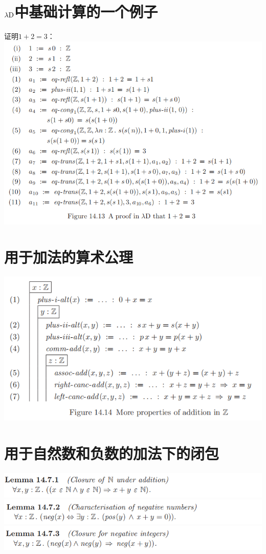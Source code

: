 \documentclass[UTF8]{article}
\begin{document}
	\section{$\lambda{\rm D}$中基础计算的一个例子}
	\noindent
	证明$1+2=3$：\\
	\includegraphics[width=0.93\linewidth]{"../imgs/14-12.png"}
	
	\section{用于加法的算术公理}
	\noindent\includegraphics[width=0.93\linewidth]{"../imgs/14-13.png"}
	
	\section{用于自然数和负数的加法下的闭包}
	\noindent\includegraphics[width=0.93\linewidth]{"../imgs/14-14.png"}\\
	\includegraphics[width=0.93\linewidth]{"../imgs/14-15.png"}\\
	\includegraphics[width=0.93\linewidth]{"../imgs/14-16.png"}
	
\end{document}

